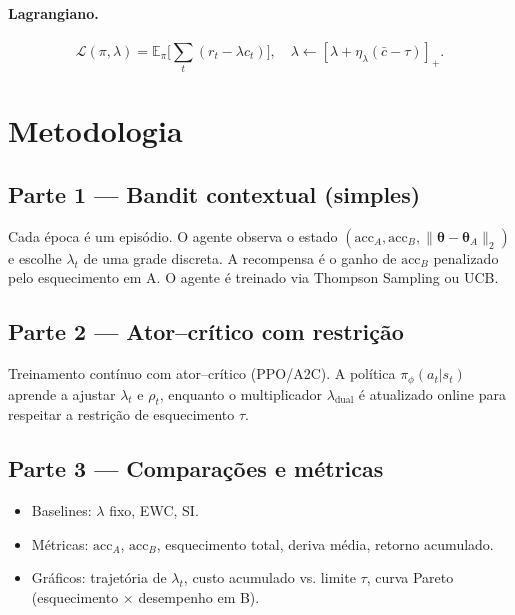 \documentclass[9pt,a4paper]{extarticle}
\begin{document}
\paragraph{Lagrangiano.}
\[
\mathcal{L}(\pi, \lambda) = \mathbb{E}_\pi\!\Big[\sum_t (r_t - \lambda c_t)\Big], 
\quad \lambda \leftarrow [\lambda + \eta_\lambda(\bar{c} - \tau)]_+.
\]

\section{Metodologia}

\subsection*{Parte 1 — Bandit contextual (simples)}
Cada época é um episódio. O agente observa o estado $(\mathrm{acc}_A,\mathrm{acc}_B,\|\bm{\theta}-\bm{\theta}_A\|_2)$ e escolhe $\lambda_t$ de uma grade discreta. A recompensa é o ganho de $\mathrm{acc}_B$ penalizado pelo esquecimento em A. O agente é treinado via Thompson Sampling ou UCB.

\subsection*{Parte 2 — Ator–crítico com restrição}
Treinamento contínuo com ator–crítico (PPO/A2C).  
A política $\pi_\phi(a_t|s_t)$ aprende a ajustar $\lambda_t$ e $\rho_t$, enquanto o multiplicador $\lambda_\text{dual}$ é atualizado online para respeitar a restrição de esquecimento $\tau$.

\subsection*{Parte 3 — Comparações e métricas}
\begin{itemize}
    \item Baselines: $\lambda$ fixo, EWC, SI.
    \item Métricas: $\mathrm{acc}_A$, $\mathrm{acc}_B$, esquecimento total, deriva média, retorno acumulado.
    \item Gráficos: trajetória de $\lambda_t$, custo acumulado vs. limite $\tau$, curva Pareto (esquecimento × desempenho em B).
\end{itemize}

\end{document}
